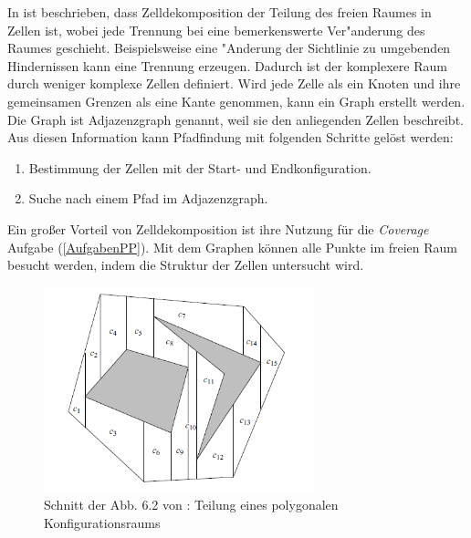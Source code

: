 In \cite{Principles:05} ist beschrieben, dass Zelldekomposition der Teilung des freien Raumes in Zellen ist, wobei jede Trennung bei eine bemerkenswerte Ver"anderung des Raumes geschieht. Beispielsweise eine "Anderung der Sichtlinie zu umgebenden Hindernissen kann eine Trennung erzeugen. Dadurch ist der komplexere Raum durch weniger komplexe Zellen definiert. Wird jede Zelle als ein Knoten und ihre gemeinsamen Grenzen als eine Kante genommen, kann ein Graph erstellt werden. Die Graph ist Adjazenzgraph genannt, weil sie den anliegenden Zellen beschreibt. 
Aus diesen Information kann Pfadfindung mit folgenden Schritte gelöst werden: 
\begin{enumerate}
	\item Bestimmung der Zellen mit der Start- und Endkonfiguration. 
	\item Suche nach einem Pfad im Adjazenzgraph.
\end{enumerate}
Ein gro{ß}er Vorteil von Zelldekomposition ist ihre Nutzung für die \textit{Coverage} Aufgabe (\ref{AufgabenPP}). Mit dem Graphen können alle Punkte im freien Raum besucht werden, indem die Struktur der Zellen untersucht wird.

\begin{figure}[H] %
	\centering
	\includegraphics[width=0.7\textwidth]{images/Cell_Dekomposition.png}
	\caption{Schnitt der Abb. 6.2 von \cite{Principles:05}: Teilung eines polygonalen Konfigurationsraums}
	\label{potentialfield01}
\end{figure}

